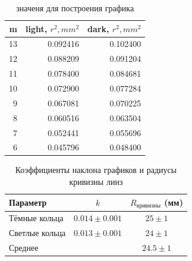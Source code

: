 \documentclass[a4paper, 12pt]{article}
\begin{document}

\begin{table}[H]
    \centering
    \begin{tabular}{rrr}
        \toprule
        m & light, $r^2, mm^2 $& dark, $r^2, mm^2$ \\
        \midrule
        13 & 0.092416 & 0.102400 \\
        12 & 0.088209 & 0.091204 \\
        11 & 0.078400 & 0.084681 \\
        10 & 0.072900 & 0.077284 \\
        9 & 0.067081 & 0.070225 \\
        8 & 0.060516 & 0.063504 \\
        7 & 0.052441 & 0.055696 \\
        6 & 0.045796 & 0.048400 \\
        \bottomrule
    \end{tabular}
    \caption{значеня для построения графика}
\end{table}

\begin{table}[H]
    \centering
    \begin{tabular}{lcc}
        \toprule
        Параметр & $k$ & $R_{\text{кривизны}}$ (мм) \\
        \midrule
        Тёмные кольца & $0.014 \pm 0.001$ & $25 \pm 1$  \\
        Светлые кольца & $0.013 \pm 0.001$ & $24 \pm 1$ \\
Среднее & & $24.5 \pm 1$ \\

        \bottomrule
    \end{tabular}
    \caption{Коэффициенты наклона графиков и радиусы кривизны линз}
\end{table}
\end{document}
